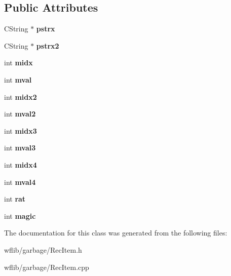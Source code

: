 \subsection*{Public Attributes}
\begin{DoxyCompactItemize}
\item 
\hypertarget{class_c_rec_item_acc84a062c744fbff7f701b0f7a0a622e}{C\-String $\ast$ {\bfseries pstrx}}\label{class_c_rec_item_acc84a062c744fbff7f701b0f7a0a622e}

\item 
\hypertarget{class_c_rec_item_a143be2cb26d005a67d6b9e412b52e652}{C\-String $\ast$ {\bfseries pstrx2}}\label{class_c_rec_item_a143be2cb26d005a67d6b9e412b52e652}

\item 
\hypertarget{class_c_rec_item_a1e3817f66462aa41b6387a4e483d3ea2}{int {\bfseries midx}}\label{class_c_rec_item_a1e3817f66462aa41b6387a4e483d3ea2}

\item 
\hypertarget{class_c_rec_item_a69d0b0e44775a87533f5498912064043}{int {\bfseries mval}}\label{class_c_rec_item_a69d0b0e44775a87533f5498912064043}

\item 
\hypertarget{class_c_rec_item_a534bc78a074122c6f8da52c6687bb20c}{int {\bfseries midx2}}\label{class_c_rec_item_a534bc78a074122c6f8da52c6687bb20c}

\item 
\hypertarget{class_c_rec_item_af2908e566063b9807e0c1ab2014316e2}{int {\bfseries mval2}}\label{class_c_rec_item_af2908e566063b9807e0c1ab2014316e2}

\item 
\hypertarget{class_c_rec_item_a12ae5391120f934377ce726a6310b1fe}{int {\bfseries midx3}}\label{class_c_rec_item_a12ae5391120f934377ce726a6310b1fe}

\item 
\hypertarget{class_c_rec_item_a5b13b4cd948818c15db51ad7e7c3fb9b}{int {\bfseries mval3}}\label{class_c_rec_item_a5b13b4cd948818c15db51ad7e7c3fb9b}

\item 
\hypertarget{class_c_rec_item_a492b513f27e640151d287570458854db}{int {\bfseries midx4}}\label{class_c_rec_item_a492b513f27e640151d287570458854db}

\item 
\hypertarget{class_c_rec_item_a8cb6680ca3d4dffc8c10ebbca9b88a6f}{int {\bfseries mval4}}\label{class_c_rec_item_a8cb6680ca3d4dffc8c10ebbca9b88a6f}

\item 
\hypertarget{class_c_rec_item_ab4e5b278e40ab3570979e616bf253094}{int {\bfseries rat}}\label{class_c_rec_item_ab4e5b278e40ab3570979e616bf253094}

\item 
\hypertarget{class_c_rec_item_aa5cbb2537726de90c73e2a5cf6b9b832}{int {\bfseries magic}}\label{class_c_rec_item_aa5cbb2537726de90c73e2a5cf6b9b832}

\end{DoxyCompactItemize}


The documentation for this class was generated from the following files\-:\begin{DoxyCompactItemize}
\item 
wflib/garbage/Rec\-Item.\-h\item 
wflib/garbage/Rec\-Item.\-cpp\end{DoxyCompactItemize}
